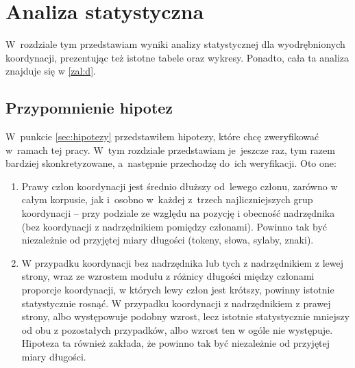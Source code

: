 \documentclass[licencjacka]{pracamgr_Kogni}
\begin{document}
    \chapter{Analiza statystyczna}\label{ch:analiza-statystyczna}
    W~rozdziale tym przedstawiam wyniki analizy statystycznej dla wyodrębnionych koordynacji, prezentując też istotne tabele oraz wykresy. Ponadto, cała ta analiza znajduje się w \ref{zal:d}.

    \section{Przypomnienie hipotez}
    W~punkcie \ref{sec:hipotezy} przedstawiłem hipotezy, które chcę zweryfikować w~ramach tej pracy. W~tym rozdziale przedstawiam je~jeszcze raz, tym razem bardziej skonkretyzowane, a~następnie przechodzę do~ich weryfikacji.
    Oto one:
    \begin{enumerate}[label=\arabic*)]
        \item 
        Prawy człon koordynacji jest średnio dłuższy od~lewego członu, zarówno w całym korpusie, jak i~osobno w~każdej z~trzech najliczniejszych grup koordynacji -- przy podziale ze względu na pozycję i obecność nadrzędnika (bez koordynacji z nadrzędnikiem pomiędzy członami). Powinno tak być niezależnie od przyjętej miary długości (tokeny, słowa, sylaby, znaki).
        \item
        W przypadku koordynacji bez nadrzędnika lub tych z nadrzędnikiem z lewej strony, wraz ze wzrostem modułu z różnicy długości między członami proporcje koordynacji, w których lewy człon jest krótszy, powinny istotnie statystycznie rosnąć. W przypadku koordynacji z nadrzędnikiem z prawej strony, albo występowuje podobny wzrost, lecz istotnie statystycznie mniejszy od obu z pozostałych przypadków, albo wzrost ten w ogóle nie występuje. Hipoteza ta również zakłada, że powinno tak być niezależnie od przyjętej miary długości.
    \end{enumerate}
    
\end{document}
